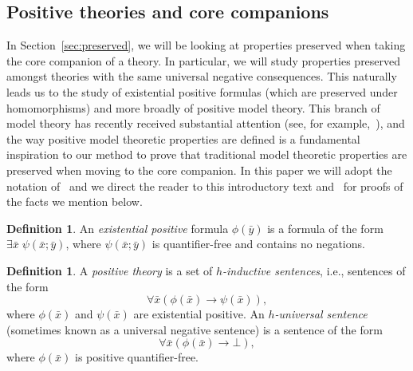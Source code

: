 \documentclass{amsart}
\theoremstyle{definition}
\newtheorem{definition}[theorem]{Definition}
\newtheorem{notation}[theorem]{Notation}
\theoremstyle{remark}
\numberwithin{equation}{section}
\newcommand{\tp}{\operatorname{tp}}
\begin{document}


\subsection{Positive theories and core companions}
In Section~\ref{sec:preserved}, we will be looking at properties preserved when taking the core companion  of a theory. In particular, we will study properties preserved amongst theories with the same universal negative consequences. This naturally leads us to the study of existential positive formulas (which are preserved under homomorphisms) and more broadly of positive model theory. This branch of model theory has recently received substantial attention (see, for example,~\cite{ben2003positive, PosModT, kamsma2023bilinear, BodHilsMartin-Journal}), and the way positive model theoretic properties are defined is a fundamental inspiration to our method to prove that traditional model theoretic properties are preserved when moving to the core companion. In this paper we will adopt the notation of~\cite{kamsma2025positivelogicintroductionmodel} and we direct the reader to this introductory text and~\cite[Chapter 2]{Book} for proofs of the facts we mention below. 

\begin{definition}
An \emph{existential positive} formula $\phi(\bar{y})$ is a formula of the form $\exists \bar{x} \; \psi(\bar{x};\bar{y})$, where $\psi(\bar{x};\bar{y})$ is quantifier-free and contains no negations.
\end{definition}
\begin{definition}
    A \emph{positive theory} is a set of \emph{$h$-inductive sentences}, i.e.,  sentences of the form 
    \[\forall \bar{x}(\phi(\bar{x})\rightarrow  \psi(\bar{x})),\]
    where $\phi(\bar{x})$ and $\psi(\bar{x})$ are existential positive. An \emph{$h$-universal sentence} (sometimes known as a universal negative sentence) is a sentence of the form 
    \[\forall \bar{x} (\phi(\bar{x})\rightarrow\bot),\]
    where $\phi(\bar{x})$ is positive quantifier-free. 
\end{definition}
\end{document}

